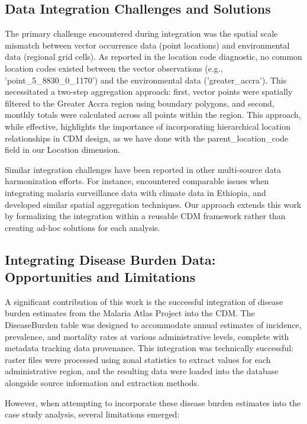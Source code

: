 \documentclass{article}
\begin{document}
\subsection{Data Integration Challenges and Solutions}
\par
The primary challenge encountered during integration was the spatial scale mismatch between vector occurrence data 
(point locations) and environmental data (regional grid cells). As reported in the location code diagnostic, 
no common location codes existed between the vector observations (e.g., 'point\_5\_8830\_0\_1170') 
and the environmental data ('greater\_accra'). This necessitated a two-step aggregation approach: first, vector points were 
spatially filtered to the Greater Accra region using boundary polygons, and second, monthly totals were calculated across 
all points within the region. This approach, while effective, highlights the importance of incorporating hierarchical 
location relationships in CDM design, as we have done with the parent\_location\_code field in our Location dimension.
\par
Similar integration challenges have been reported in other multi-source data harmonization efforts. For instance, 
\citet{2017.CL.IMS} encountered comparable issues when integrating malaria surveillance data with climate data in Ethiopia, 
and developed similar spatial aggregation techniques. Our approach extends this work by formalizing the integration within a 
reusable CDM framework rather than creating ad-hoc solutions for each analysis.

\subsection{Integrating Disease Burden Data: Opportunities and Limitations}
\par
A significant contribution of this work is the successful integration of disease burden estimates from the Malaria Atlas 
Project into the CDM. The DiseaseBurden table was designed to accommodate annual estimates of incidence, prevalence, and 
mortality rates at various administrative levels, complete with metadata tracking data provenance. This integration was 
technically successful: raster files were processed using zonal statistics to extract values for each administrative region, 
and the resulting data were loaded into the database alongside source information and extraction methods.
\par
However, when attempting to incorporate these disease burden estimates into the case study analysis, several limitations emerged:
\end{document}
